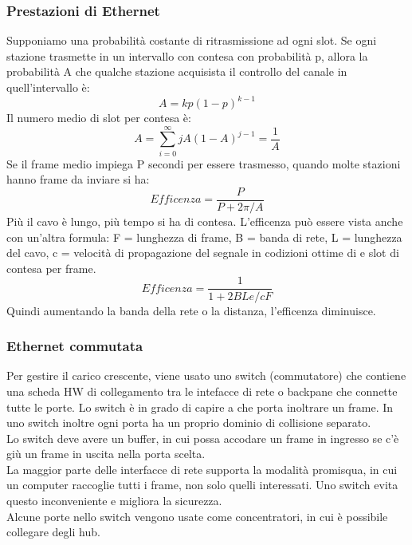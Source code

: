 \documentclass{article}
\begin{document}
\subsubsection{Prestazioni di Ethernet} Supponiamo una probabilità costante di ritrasmissione ad ogni slot. Se ogni stazione trasmette in un intervallo con contesa con probabilità p, allora la probabilità A che qualche stazione acquisista il controllo del canale in quell'intervallo è:
\begin{equation}
 A = kp(1-p)^{k-1}
\end{equation}
Il numero medio di slot per contesa è:
\begin{equation}
 A = \sum_{i=0}^\infty jA(1-A)^{j-1}=\frac{1}{A}
\end{equation}
Se il frame medio impiega P secondi per essere trasmesso, quando molte stazioni hanno frame da inviare si ha:
\begin{equation}
 Efficenza = \frac{P}{P+2\pi/A}
\end{equation}
Più il cavo è lungo, più tempo si ha di contesa. L'efficenza può essere vista anche con un'altra formula: F = lunghezza di frame, B = banda di rete, L = lunghezza del cavo, c = velocità di propagazione del segnale in codizioni ottime di e slot di contesa per frame.
\begin{equation} 
 Efficenza = \frac{1}{1+2BLe/cF}
\end{equation}
Quindi aumentando la banda della rete o la distanza, l'efficenza diminuisce. 
\subsubsection{Ethernet commutata}
Per gestire il carico crescente, viene usato uno switch (commutatore) che contiene una scheda HW  di collegamento tra le intefacce di rete o backpane che connette tutte le porte. Lo switch è in grado di capire a che porta inoltrare un frame. In uno switch inoltre ogni porta ha un proprio dominio di collisione separato.\\
Lo switch deve avere un buffer, in cui possa accodare un frame in ingresso se c'è giù un frame in uscita nella porta scelta.\\
La maggior parte delle interfacce di rete supporta la modalità promisqua, in cui un computer raccoglie tutti i frame, non solo quelli interessati. Uno switch evita questo inconveniente e migliora la sicurezza.\\
Alcune porte nello switch vengono usate come concentratori, in cui è possibile collegare degli hub.
\end{document}
